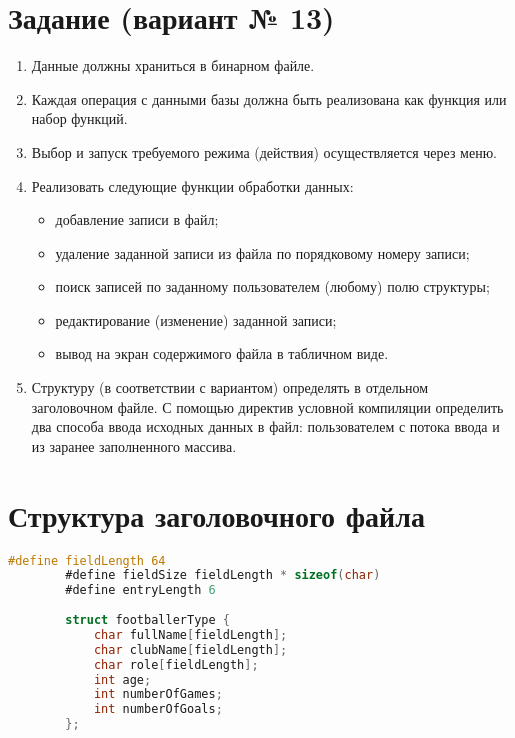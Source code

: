 \documentclass[12pt]{article}
\begin{document}
	\newpage
	
	
	\section*{Задание (вариант № 13)}
	
	\begin{enumerate}
		\item Данные должны храниться в бинарном файле.
		\item Каждая операция с данными базы должна быть реализована как функция или набор функций.
		\item Выбор и запуск требуемого режима (действия) осуществляется через меню.
		\item Реализовать следующие функции обработки данных:
		\begin{itemize}
			\item добавление записи в файл;
			\item удаление заданной записи из файла по порядковому номеру записи;
			\item поиск записей по заданному пользователем (любому) полю структуры;
			\item редактирование (изменение) заданной записи;
			\item вывод на экран содержимого файла в табличном виде.
		\end{itemize}
		\item Структуру (в соответствии с вариантом) определять в отдельном заголовочном файле. С
		помощью директив условной компиляции определить два способа ввода исходных данных в
		файл: пользователем с потока ввода и из заранее заполненного массива.
	\end{enumerate}
	
	\newpage
	
	\section*{Структура заголовочного файла}
	
	\begin{lstlisting}[language=C]
		#define fieldLength 64
		#define fieldSize fieldLength * sizeof(char)
		#define entryLength 6
		
		struct footballerType {
			char fullName[fieldLength];
			char clubName[fieldLength];
			char role[fieldLength];
			int age;
			int numberOfGames;
			int numberOfGoals;
		};
	\end{lstlisting}
	
\end{document}
